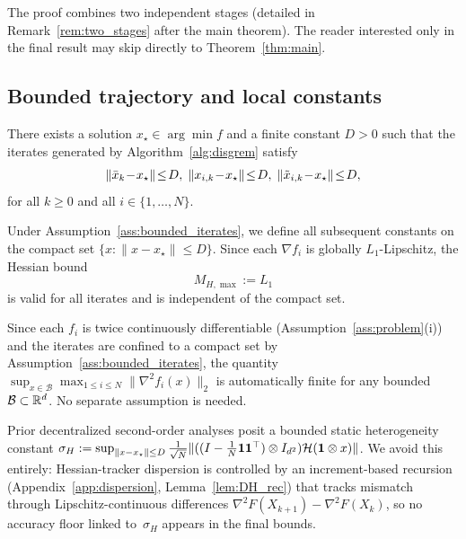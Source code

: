 \documentclass[review,onefignum,onetabnum]{siamart171218}
\begin{document}
	The proof combines two independent stages (detailed in
	Remark~\ref{rem:two_stages} after the main theorem).
	The reader interested only in the final result may skip directly to
	Theorem~\ref{thm:main}.
	
	\subsection{Bounded trajectory and local constants}\label{ssec:iterate_bound}
	
	\begin{assumption}\label{ass:bounded_iterates}
		There exists a solution $x_\star\in\arg\min f$ and a finite constant
		$D>0$ such that the iterates generated by Algorithm~\ref{alg:disgrem}
		satisfy
		\begin{equation}\label{eq:bounded_levelset}
			\norm{\bar x_k\!-\!x_\star}\!\le\! D,\;
			\norm{x_{i,k}\!-\!x_\star}\!\le\! D,\;
			\norm{\tilde x_{i,k}\!-\!x_\star}\!\le\! D,
		\end{equation}
		for all $k\ge 0$ and all $i\in\{1,\dots,N\}$.
	\end{assumption}
	
	Under Assumption~\ref{ass:bounded_iterates}, we define all subsequent
	constants on the compact set $\{x:\|x-x_\star\|\le D\}$.
	Since each $\nabla f_i$ is globally $L_1$-Lipschitz, the Hessian bound
	\begin{equation}\label{eq:MHmax_def}
		M_{H,\max}:=L_1
	\end{equation}
	is valid for all iterates and is independent of the compact set.
	
	\begin{remark}
		Since each $f_i$ is twice continuously differentiable (Assumption~\ref{ass:problem}(i))
		and the iterates are confined to a compact set by
		Assumption~\ref{ass:bounded_iterates},
		the quantity $\sup_{x\in\mathcal B}\max_{1\le i\le N}\|\nabla^2 f_i(x)\|_2$
		is automatically finite for any bounded $\mathcal B\subset\mathbb{R}^d$.
		No separate assumption is needed.
	\end{remark}
	
	\begin{remark}
		Prior decentralized second-order analyses
		\citep{mokhtari2016esom,sun2022sonata,maritan2023networkgiant} posit a bounded
		static heterogeneity constant
		$\sigma_H:=\sup_{\|x-x_\star\|\le D}
		\frac{1}{\sqrt N}\|((I-\frac{1}{N}\mathbf{1}\mathbf{1}^\top)\otimes I_{d^2})\mathcal H(\mathbf{1}\otimes x)\|$.
		We avoid this entirely: Hessian-tracker dispersion is controlled
		by an increment-based recursion
		(Appendix~\ref{app:dispersion}, Lemma~\ref{lem:DH_rec})
		that tracks mismatch through Lipschitz-continuous
		differences $\nabla^2 F(X_{k+1})-\nabla^2 F(X_k)$,
		so no accuracy floor linked to~$\sigma_H$ appears in the
		final bounds.
	\end{remark}
	
\end{document}
